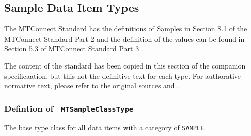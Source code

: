 \FloatBarrier
\subsection{Sample Data Item Types} \label{model:SampleDataItemTypes}

The MTConnect Standard has the definitions of Samples in 
Section 8.1 of the MTConnect Standard Part 2 \cite{MTCPart2} and the 
definition of the values can be found in Section 5.3 of MTConnect Standard Part 3 \cite{MTCPart3}. 

The content of the standard has been copied in this section of the companion specificaation,
but this not the definitive text for each type. For authorative normative text, please refer 
to the original sources \cite{MTCPart2} and \cite{MTCPart3}.

\subsubsection{Defintion of \texttt{ MTSampleClassType}} \label{type:MTSampleClassType}

\FloatBarrier

The base type class for all data items with a category of \texttt{SAMPLE}.


